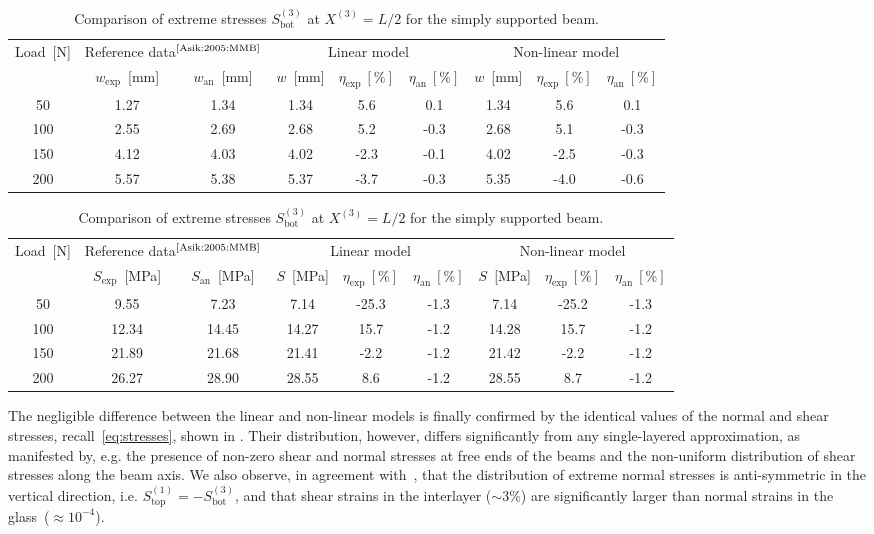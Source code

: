 \documentclass[11pt]{article}
\newcommand{\rev}[1]{#1}
\newcommand{\lay}[1]{^{(#1)}}
\newcommand{\X}[1]{X\lay{#1}}
\newcommand{\wc}[1]{w_0\lay{#1}}
\newcommand{\etaexp}{\eta_\mathrm{exp}}
\newcommand{\etaan}{\eta_\mathrm{an}}
\begin{document}
\begin{table}[h]
\caption{Comparison of mid-span deflections $\wc{3}$ at $\X{3} = L/2$ for the
simply supported beam.}
\label{tab:ss_deflection_comparison}
\centering
\begin{tabular}{ccccccccc}
\hline
Load~[N] & 
\multicolumn{2}{c}{Reference data$^\text{\cite{Asik:2005:MMB}}$} &
\multicolumn{3}{c}{Linear model} & 
\multicolumn{3}{c}{Non-linear model} \\
& $w_\mathrm{exp}$~[mm] & $w_\mathrm{an}$~[mm] &
$w$~[mm] & $\etaexp~[\%]$ & $\etaan~[\%]$ &
$w$~[mm] & $\etaexp~[\%]$ & $\etaan~[\%]$ \\
\hline
50	& 1.27 & 1.34 & 1.34 & 5.6 & 0.1 & 1.34	& 5.6 & 0.1 \\
100	& 2.55 & 2.69 & 2.68 & 5.2 & -0.3 & 2.68 & 5.1 & -0.3 \\
150	& 4.12 & 4.03 & 4.02 & -2.3 & -0.1 & 4.02 & -2.5 & -0.3 \\
200	& 5.57 & 5.38 & 5.37 & -3.7	& -0.3 & 5.35 & -4.0 & -0.6 \\
\hline
\end{tabular}
\caption{Comparison of extreme stresses $S\lay{3}_\rev{\mathrm{bot}}$ at $\X{3}
= L/2$ for the simply supported beam.}
\label{tab:ss_stress_comparison}
\begin{tabular}{ccccccccc}
\hline
Load~[N] & 
\multicolumn{2}{c}{Reference data$^\text{\cite{Asik:2005:MMB}}$} &
\multicolumn{3}{c}{Linear model} & 
\multicolumn{3}{c}{Non-linear model} \\
& $S_\mathrm{exp}$~[MPa] & $S_\mathrm{an}$~[MPa] &
$S$~[MPa] & $\etaexp~[\%]$ & $\etaan~[\%]$ &
$S$~[MPa] & $\etaexp~[\%]$ & $\etaan~[\%]$ \\
\hline
50  & 9.55  & 7.23  & 7.14  & -25.3 & -1.3 & 7.14  & -25.2 & -1.3 \\
100	& 12.34 & 14.45 & 14.27 &  15.7	& -1.2 & 14.28 & 15.7 & -1.2 \\
150	& 21.89	& 21.68	& 21.41	& -2.2 & -1.2 & 21.42 & -2.2 & -1.2 \\
200	& 26.27	& 28.90	& 28.55 &  8.6 & -1.2 & 28.55 & 8.7	& -1.2 \\
\hline
\end{tabular}
\end{table}

\rev{The negligible difference between the linear and non-linear models is
finally confirmed by the identical values of the normal and shear
stresses, recall~\eqref{eq:stresses}, shown in \Fref{fig:stress_distrib_simple}.
Their distribution, however, differs significantly from any single-layered
approximation, as manifested by, e.g. the presence of non-zero shear and normal
stresses \rev{at free ends} of the beams and the non-uniform distribution of
shear stresses along the beam axis. We also observe, in agreement
with~\cite{Asik:2005:MMB}, that the distribution of extreme normal stresses is
anti-symmetric in the vertical direction, i.e. $S_\mathrm{top}\lay{1} = -
S_\mathrm{bot}\lay{3}$, and that shear strains in the interlayer ($\sim 3\%$)
are significantly larger than normal strains in the glass~($\approx
10^{-4}$).}
\end{document}

